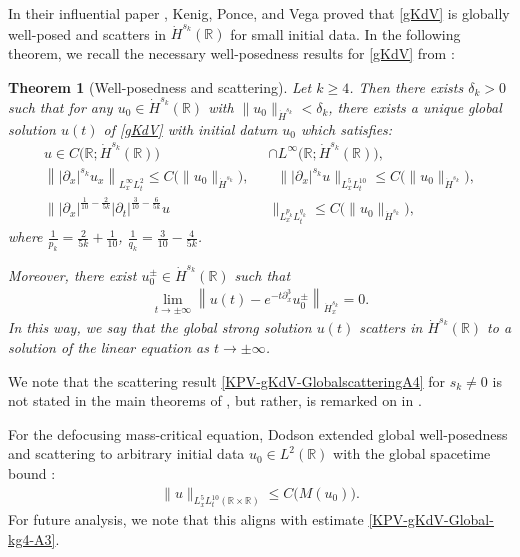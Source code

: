 \documentclass[10pt, reqno]{amsart}
\numberwithin{equation}{section}
\newcommand{\R}{\mathbb{R}}
\newtheorem{theorem}{Theorem}[section]
\theoremstyle{definition}
\theoremstyle{remark}
\begin{document}
In their influential paper \cite{KPV93}, Kenig, Ponce, and Vega proved that \eqref{gKdV} is globally well-posed and scatters in $\dot{H}^{s_k}(\R)$ for small initial data. In the following theorem, we recall the necessary well-posedness results for \eqref{gKdV} from \cite{KPV93}:
\begin{theorem}[Well-posedness and scattering] \label{KPV-gKdV-Global-kg4}
Let $k\geq4$. Then there exists $\delta_k>0$ such that for any $u_0 \in \dot{H}^{s_k}(\R)$ with
$\|u_0\|_{\dot{H}^{s_k}}<\delta_k$,
there exists a unique global solution $u(t)$ of \eqref{gKdV} with initial datum $u_0$ which satisfies:
	\begin{align}
	u\in C\big(\R; \dot{H}^{s_k}(\R) \big)& \cap L^{\infty}\big(\R; \dot{H}^{s_k}(\R) \big), \nonumber \\
	\left\||\partial_x|^{s_k} u_x \right\|_{L^{\infty}_{x}L^{2}_{t}}\leq C\big(\|u_0\|_{\dot{H}^{s_k}}\big),
\;\;&\;\;	\||\partial_x|^{s_k}u\|_{L^{5}_{x}L^{10}_{t}}\leq C\big(\|u_0\|_{\dot{H}^{s_k}}\big),\label{KPV-gKdV-Global-kg4-A2} \\
		\big\||\partial_x|^{\frac{1}{10}-\frac{2}{5k}}|\partial_t|^{\frac{3}{10}-\frac{6}{5k}}u&\big\|_{L^{p_k}_{x}L^{q_k}_{t}} \leq C\big(\|u_0\|_{\dot{H}^{s_k}}\big), \label{KPV-gKdV-Global-kg4-A3}
	\end{align}
    where $\frac{1}{p_k}=\frac{2}{5k}+\frac{1}{10}$, $\frac{1}{q_k}=\frac{3}{10}-\frac{4}{5k}$.

    Moreover, there exist $u_0^{\pm}\in \dot{H}^{s_k}(\R)$ such that
	\begin{align}\label{KPV-gKdV-GlobalscatteringA4}
		\lim_{t\to \pm \infty}\left\|u(t)- e^{-t\partial^3_x}u_0^{\pm}\right\|_{\dot{H}^{s_k}_{x}}=0.
	\end{align}
    In this way, we say that the global strong solution $u(t)$ scatters in $\dot{H}^{s_k}(\R)$ to a solution of the linear equation as $t\to \pm \infty$.
\end{theorem}
We note that the scattering result \eqref{KPV-gKdV-GlobalscatteringA4} for $s_k \neq 0$ is not stated in the main theorems of \cite{KPV93}, but rather, is remarked on  in \cite[\S1]{KPV93}.

For the defocusing mass-critical equation, Dodson extended global well-posedness and scattering to arbitrary initial data $u_0 \in L^2(\R)$ with the global spacetime bound \cite{Dodson2017}:
\begin{align}\label{gKdV-Dodson}
    \| u \|_{L^{5}_{x}L^{10}_{t}(\R\times\R)}\leq C\big(M(u_0)\big). 
\end{align}
For future analysis, we note that this aligns with estimate \eqref{KPV-gKdV-Global-kg4-A3}.
\end{document}
